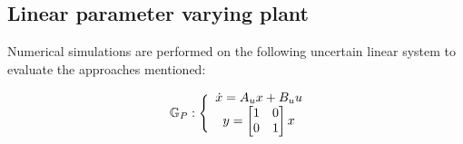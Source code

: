 \documentclass[letterpaper, 10 pt, conference]{ieeeconf}  %
\begin{document}
\subsection{Linear parameter varying plant}
Numerical simulations are performed on the following uncertain linear system to evaluate the approaches mentioned:

\begin{equation}
\small
\begin{matrix}
\mathbb{G}_P : \Bigg\{ & \hspace{-5pt}
\begin{matrix}
\dot{x} = A_ux+B_uu \\
y = \begin{bmatrix} 1 & 0 \\ 0 & 1 \end{bmatrix} x 
\end{matrix}
\end{matrix}
\end{equation}
\end{document}

